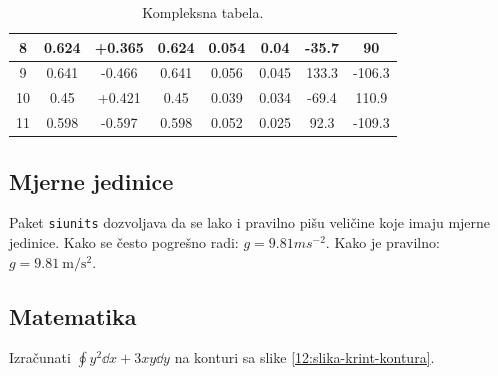 \begin{table}[h]
\begin{tabular}{SSSSSSSS}
		8     & 0.624                                  & +0.365                                  & 0.624               & 0.054                          & 0.04    & -35.7                       & 90                         \\      & 0.641                                  & -0.466                                  & 0.641               & 0.056                          & 0.045   & 133.3                       & -106.3                     \\
		10    & 0.45                                   & +0.421                                  & 0.45                & 0.039                          & 0.034   & -69.4                       & 110.9                      \\
		11    & 0.598                                  & -0.597                                  & 0.598               & 0.052                          & 0.025   & 92.3                        & -109.3                     \\ \bottomrule
	\end{tabular}
	\caption{Kompleksna tabela.}
\end{table}

\subsection{Mjerne jedinice}

Paket \texttt{siunits} dozvoljava da se lako i pravilno pišu veličine koje imaju mjerne jedinice. Kako se često pogrešno radi: $g = 9.81 ms^{-2}$.
Kako je pravilno: $g = \SI{9.81}{\meter\per\second\squared}$.

\subsection{Matematika}

\begin{zadatak}
	\label{12:zd-krint-kontura}
	Izračunati $\displaystyle \oint y^2 \dd{x} + 3xy \dd{y}$ na konturi sa slike \ref{12:slika-krint-kontura}.
\end{zadatak}

